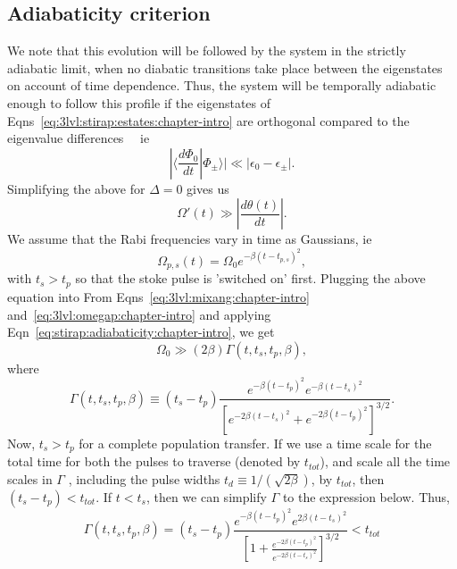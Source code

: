 \subsection{Adiabaticity criterion}

We note that this evolution will be followed by the system in the strictly adiabatic limit, when no diabatic transitions take place between the eigenstates on account of time dependence. Thus, the system will be temporally adiabatic enough to follow this profile if the eigenstates of Eqns~\ref{eq:3lvl:stirap:estates:chapter-intro} are orthogonal compared to the eigenvalue differences~\cite{stirap:theory}~\cite{stirap:review} ie
\begin{equation}
|\langle \frac{d\Phi_0}{dt}|\Phi_\pm\rangle| \ll |\epsilon_0-\epsilon_\pm|.
\end{equation}
Simplifying the above for $\Delta=0$ gives us
\begin{equation}
\Omega'(t)\gg |\frac{d\theta(t)}{dt}|.
\label{eq:stirap:adiabaticity:chapter-intro}
\end{equation}
We assume that the Rabi frequencies vary in time as Gaussians, ie
\begin{equation}
\Omega_{p,s}(t) = \Omega_0 e^{-\beta (t-t_{p,s})^2} ,
\end{equation}
with $t_s>t_p$ so that the stoke pulse is 'switched on' first. Plugging the above equation into From Eqns~\ref{eq:3lvl:mixang:chapter-intro} and~\ref{eq:3lvl:omegap:chapter-intro} and applying Eqn~\ref{eq:stirap:adiabaticity:chapter-intro}, we get 
\begin{equation}
\Omega_0 \gg \left( 2\beta \right) \Gamma(t, t_s, t_p, \beta),
\label{eq:inequality:chapter-intro}
\end{equation}
where
\begin{equation}
\Gamma(t,t_s, t_p, \beta) \equiv \left( t_s - t_p \right) \frac{e^{-\beta (t-t_p)^2}e^{-\beta (t-t_s)^2}}{\left[ e^{-2\beta(t-t_s)^2} + e^{-2\beta(t-t_p)^2}     \right]^{3/2}}.
\end{equation}
Now, $t_s>t_p$ for a complete population transfer. If we use a time scale for the total time for both the pulses to traverse (denoted by $t_{tot}$), and scale all the time scales in $\Gamma$ , including the pulse widths $t_d \equiv 1/(\sqrt{2\beta})$,  by $t_{tot}$, then $(t_s-t_p)<t_{tot}$. If $t<t_s$, then we can simplify $\Gamma$ to the expression below. Thus,
\begin{equation}
\Gamma(t,t_s,t_p,\beta) = \left( t_s-t_p \right) \frac{e^{-\beta (t-t_p)^2}e^{2 \beta (t-t_s)^2}}{\left[ 1 + \frac{e^{-2\beta(t-t_p)^2}}{e^{-2\beta(t-t_s)^2}}     \right]^{3/2}}<t_{tot} 
\end{equation}
